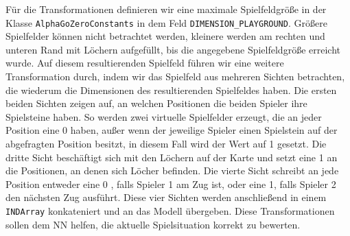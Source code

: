 \documentclass[12pt,a4paper]{article}
\begin{document}
Für die Transformationen definieren wir eine maximale Spielfeldgröße in der Klasse \texttt{AlphaGoZeroConstants} in dem Feld \texttt{DIMENSION\_PLAYGROUND}. Größere Spielfelder können nicht betrachtet werden, kleinere werden am rechten und unteren Rand mit Löchern aufgefüllt, bis die angegebene Spielfeldgröße erreicht wurde.
Auf diesem resultierenden Spielfeld führen wir eine weitere Transformation durch, indem wir das Spielfeld aus mehreren Sichten betrachten, die wiederum die Dimensionen des resultierenden Spielfeldes haben. Die ersten beiden Sichten zeigen auf, an welchen Positionen die beiden Spieler ihre Spielsteine haben. So werden zwei virtuelle Spielfelder erzeugt, die an jeder Position eine 0 haben, außer wenn der jeweilige Spieler einen Spielstein auf der abgefragten Position besitzt, in diesem Fall wird der Wert auf \glqq{}1\grqq{} gesetzt. Die dritte Sicht beschäftigt sich mit den Löchern auf der Karte und setzt eine \glqq{}1\grqq{}  an die Positionen, an denen sich Löcher befinden. Die vierte Sicht schreibt an jede Position entweder eine \glqq{}0\grqq{} , falls Spieler 1 am Zug ist, oder eine \glqq{}1\grqq{}, falls Spieler 2 den nächsten Zug ausführt. Diese vier Sichten werden anschließend in einem \texttt{INDArray} konkateniert und an das Modell übergeben. Diese Transformationen sollen dem NN helfen, die aktuelle Spielsituation korrekt zu bewerten. \bigskip
\end{document}

